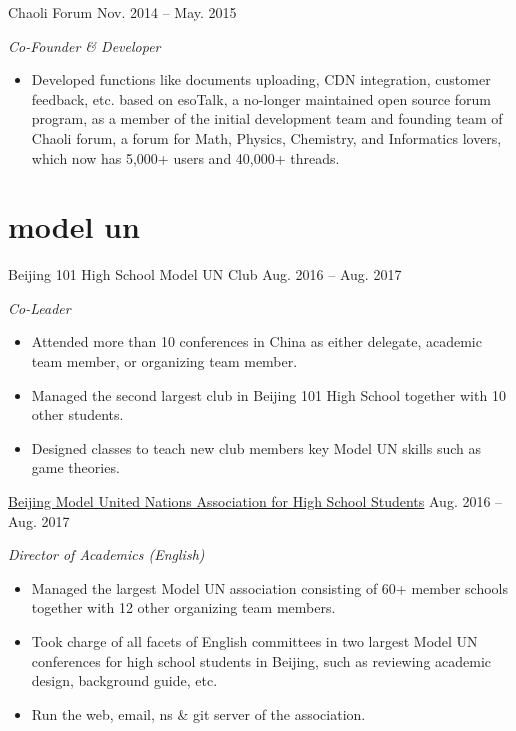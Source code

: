 \documentclass[hidelinks__VERSION__]{adamyi-cv}
\begin{document}
\begin{entrylist}

\entry
{Chaoli Forum}
{Nov. 2014 -- May. 2015}
{\emph{Co-Founder \& Developer}
\begin{itemize}
\item Developed functions like documents uploading, CDN integration, customer feedback, etc. based on esoTalk, a no-longer maintained open source forum program, as a member of the initial development team and founding team of Chaoli forum, a forum for Math, Physics, Chemistry, and Informatics lovers, which now has 5,000+ users and 40,000+ threads.
\end{itemize}}


\end{entrylist}


\section{model un}

\begin{entrylist}


\entry
{Beijing 101 High School Model UN Club}
{Aug. 2016 -- Aug. 2017}
{\emph{Co-Leader}
\begin{itemize}
\item Attended more than 10 conferences in China as either delegate, academic team member, or organizing team member.
\item Managed the second largest club in Beijing 101 High School together with 10 other students.
\item Designed classes to teach new club members key Model UN skills such as game theories.
\end{itemize}}


\entry
{\href{https://bjmun.org}{Beijing Model United Nations Association for High School Students}}
{Aug. 2016 -- Aug. 2017}
{\emph{Director of Academics (English)}
\begin{itemize}
\item Managed the largest Model UN association consisting of 60+ member schools together with 12 other organizing team members.
\item Took charge of all facets of English committees in two largest Model UN conferences for high school students in Beijing, such as reviewing academic design, background guide, etc.
\item Run the web, email, ns \& git server of the association.
\end{itemize}}


\end{entrylist}
\end{document}

